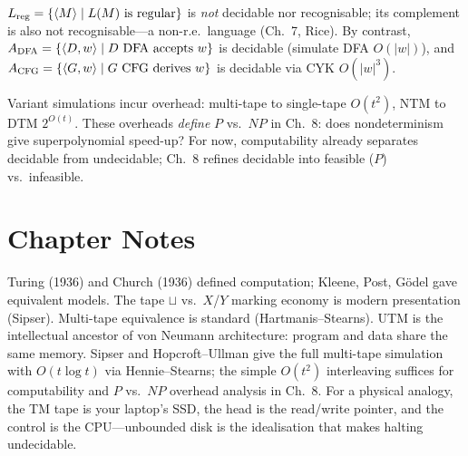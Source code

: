 \begin{example}
$L_{\rm reg}=\{\langle M\rangle\mid L(M)\text{ is regular}\}$ is \emph{not} decidable nor recognisable; its complement is also not recognisable---a non-r.e.\ language (Ch.~7, Rice). By contrast, $A_{\rm DFA}=\{\langle D,w\rangle\mid D\text{ DFA accepts }w\}$ is decidable (simulate DFA $O(|w|)$), and $A_{\rm CFG}=\{\langle G,w\rangle\mid G\text{ CFG derives }w\}$ is decidable via CYK $O(|w|^3)$.
\end{example}

\begin{remark}
Variant simulations incur overhead: multi-tape to single-tape $O(t^2)$, NTM to DTM $2^{O(t)}$. These overheads \emph{define} $P$ vs.\ $NP$ in Ch.~8: does nondeterminism give superpolynomial speed-up? For now, computability already separates decidable from undecidable; Ch.~8 refines decidable into feasible ($P$) vs.\ infeasible.
\end{remark}

\section{Chapter Notes}
Turing (1936) and Church (1936) defined computation; Kleene, Post, G\"odel gave equivalent models. The tape $\sqcup$ vs.\ $X$/$Y$ marking economy is modern presentation (Sipser).
Multi-tape equivalence is standard (Hartmanis--Stearns). UTM is the intellectual ancestor of von Neumann architecture: program and data share the same memory.
Sipser and Hopcroft--Ullman give the full multi-tape simulation with $O(t\log t)$ via Hennie--Stearns; the simple $O(t^2)$ interleaving suffices for computability and $P$ vs.\ $NP$ overhead analysis in Ch.~8.
For a physical analogy, the TM tape is your laptop's SSD, the head is the read/write pointer, and the control is the CPU---unbounded disk is the idealisation that makes halting undecidable.

